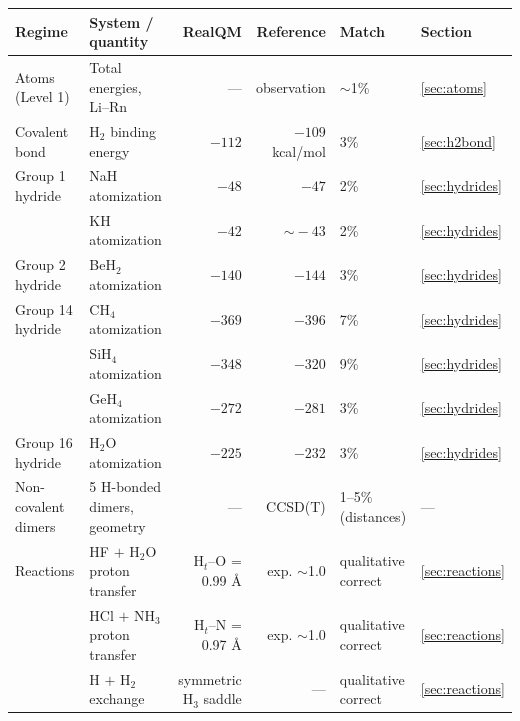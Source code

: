 \documentclass[11pt]{article}
\begin{document}
\begin{table}[h!]
\centering
\small
\renewcommand{\arraystretch}{1.15}
\begin{tabular}{l l r r l l}
\toprule
\textbf{Regime} & \textbf{System / quantity} & \textbf{RealQM} & \textbf{Reference} & \textbf{Match} & \textbf{Section} \\
\midrule
Atoms (Level 1)        & Total energies, Li--Rn        & ---         & observation     & $\sim$1\%               & \ref{sec:atoms}     \\
\midrule
Covalent bond          & H$_2$ binding energy          & $-112$      & $-109$ kcal/mol & 3\%                     & \ref{sec:h2bond}    \\
\midrule
Group 1 hydride        & NaH atomization                & $-48$       & $-47$           & 2\%                     & \ref{sec:hydrides}  \\
                       & KH atomization                 & $-42$       & $\sim\!-43$     & 2\%                     & \ref{sec:hydrides}  \\
Group 2 hydride        & BeH$_2$ atomization            & $-140$      & $-144$          & 3\%                     & \ref{sec:hydrides}  \\
Group 14 hydride       & CH$_4$ atomization             & $-369$      & $-396$          & 7\%                     & \ref{sec:hydrides}  \\
                       & SiH$_4$ atomization            & $-348$      & $-320$          & 9\%                     & \ref{sec:hydrides}  \\
                       & GeH$_4$ atomization            & $-272$      & $-281$          & 3\%                     & \ref{sec:hydrides}  \\
Group 16 hydride       & H$_2$O atomization             & $-225$      & $-232$          & 3\%                     & \ref{sec:hydrides}  \\
\midrule
Non-covalent dimers    & 5 H-bonded dimers, geometry    & ---         & CCSD(T)         & 1--5\% (distances)      & ---                 \\
\midrule
Reactions              & HF $+$ H$_2$O proton transfer    & H$_t$--O = 0.99 \AA & exp. $\sim$1.0  & qualitative correct  & \ref{sec:reactions} \\
                       & HCl $+$ NH$_3$ proton transfer   & H$_t$--N = 0.97 \AA & exp. $\sim$1.0  & qualitative correct  & \ref{sec:reactions} \\
                       & H $+$ H$_2$ exchange             & symmetric H$_3$ saddle & ---       & qualitative correct & \ref{sec:reactions} \\

\end{tabular}
\end{table}
\end{document}

